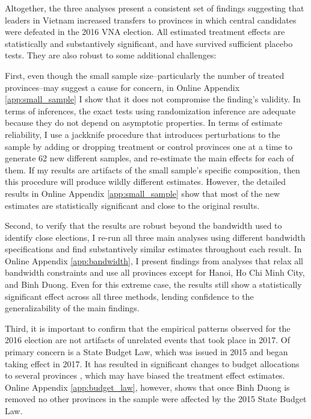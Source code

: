 \documentclass[12pt]{article}
\newcommand{\1}{\mathbbm{1}}
\begin{document}

Altogether, the three analyses present a consistent set of findings suggesting that leaders in Vietnam increased transfers to provinces in which central candidates were defeated in the 2016 VNA election. All estimated treatment effects are statistically and substantively significant, and have survived sufficient placebo tests. They are also robust to some additional challenges:

First, even though the small sample size--particularly the number of treated provinces--may suggest a cause for concern, in Online Appendix \ref{app:small_sample} I show that it does not compromise the finding's validity. In terms of inferences, the exact tests using randomization inference are adequate because they do not depend on asymptotic properties. In terms of estimate reliability, I use a jackknife procedure that introduces perturbations to the sample by adding or dropping treatment or control provinces one at a time to generate 62 new different samples, and re-estimate the main effects for each of them. If my results are artifacts of the small sample's specific composition, then this procedure will produce wildly different estimates. However, the detailed results in Online Appendix \ref{app:small_sample} show that most of the new estimates are statistically significant and close to the original results.

Second, to verify that the results are robust beyond the bandwidth used to identify close elections, I re-run all three main analyses using different bandwidth specifications and find substantively similar estimates throughout each result. In Online Appendix \ref{app:bandwidth}, I present findings from analyses that relax all bandwidth constraints and use all provinces except for Hanoi, Ho Chi Minh City, and Binh Duong. Even for this extreme case, the results still show a statistically significant effect across all three methods, lending confidence to the generalizability of the main findings. 

Third, it is important to confirm that the empirical patterns observed for the 2016 election are not artifacts of unrelated events that took place in 2017. Of primary concern is a State Budget Law, which was issued in 2015 and began taking effect in 2017. It has resulted in significant changes to budget allocations to several provinces \citep{BaoViet2016}, which may have biased the treatment effect estimates. Online Appendix \ref{app:budget_law}, however, shows that once Binh Duong is removed no other provinces in the sample were affected by the 2015 State Budget Law.
\end{document}
